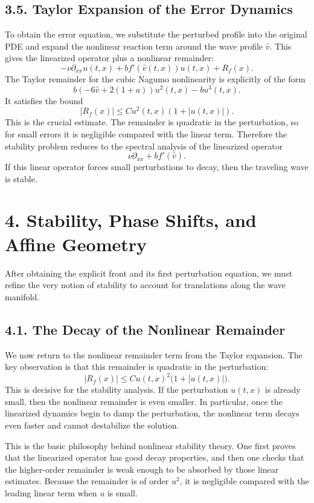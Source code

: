 \documentclass[11pt]{article}
\theoremstyle{definition}
\theoremstyle{remark}
\begin{document}
\subsection*{3.5. Taylor Expansion of the Error Dynamics}
To obtain the error equation, we substitute the perturbed profile into the original PDE and expand the nonlinear reaction term around the wave profile \(\widehat v\). This gives the linearized operator plus a nonlinear remainder:
\[
-\nu\partial_{xx}u(t,x)+bf'(\widehat v(t,x))u(t,x)+R_f(x).
\]
The Taylor remainder for the cubic Nagumo nonlinearity is explicitly of the form
\[
b(-6\widehat v+2(1+a))u^2(t,x)-bu^3(t,x).
\]
It satisfies the bound
\[
|R_f(x)|\le Cu^2(t,x)(1+|u(t,x)|).
\]
This is the crucial estimate. The remainder is quadratic in the perturbation, so for small errors it is negligible compared with the linear term. Therefore the stability problem reduces to the spectral analysis of the linearized operator
\[
\nu\partial_{xx}+bf'(\widehat v).
\]
If this linear operator forces small perturbations to decay, then the traveling wave is stable.

\section*{4. Stability, Phase Shifts, and Affine Geometry}
After obtaining the explicit front and its first perturbation equation, we must refine the very notion of stability to account for translations along the wave manifold.

\subsection*{4.1. The Decay of the Nonlinear Remainder}
We now return to the nonlinear remainder term from the Taylor expansion. The key observation is that this remainder is quadratic in the perturbation:
\[
|R_f(x)|\le Cu(t,x)^2\bigl(1+|u(t,x)|\bigr).
\]
This is decisive for the stability analysis. If the perturbation \(u(t,x)\) is already small, then the nonlinear remainder is even smaller. In particular, once the linearized dynamics begin to damp the perturbation, the nonlinear term decays even faster and cannot destabilize the solution.

This is the basic philosophy behind nonlinear stability theory. One first proves that the linearized operator has good decay properties, and then one checks that the higher-order remainder is weak enough to be absorbed by those linear estimates. Because the remainder is of order \(u^2\), it is negligible compared with the leading linear term when \(u\) is small.
\end{document}
